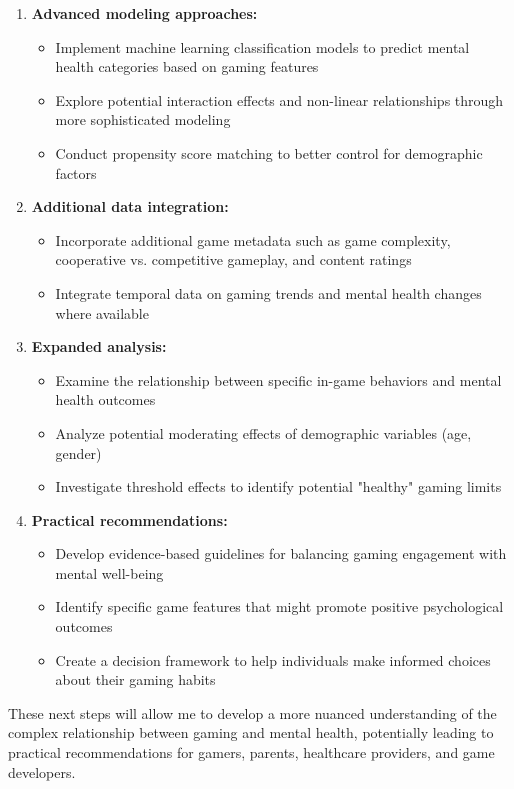 \documentclass[12pt]{article}
\begin{document}
\begin{enumerate}
    \item \textbf{Advanced modeling approaches:}
    \begin{itemize}
        \item Implement machine learning classification models to predict mental health categories based on gaming features
        \item Explore potential interaction effects and non-linear relationships through more sophisticated modeling
        \item Conduct propensity score matching to better control for demographic factors
    \end{itemize}

    \item \textbf{Additional data integration:}
    \begin{itemize}
        \item Incorporate additional game metadata such as game complexity, cooperative vs. competitive gameplay, and content ratings
        \item Integrate temporal data on gaming trends and mental health changes where available
    \end{itemize}

    \item \textbf{Expanded analysis:}
    \begin{itemize}
        \item Examine the relationship between specific in-game behaviors and mental health outcomes
        \item Analyze potential moderating effects of demographic variables (age, gender)
        \item Investigate threshold effects to identify potential "healthy" gaming limits
    \end{itemize}

    \item \textbf{Practical recommendations:}
    \begin{itemize}
        \item Develop evidence-based guidelines for balancing gaming engagement with mental well-being
        \item Identify specific game features that might promote positive psychological outcomes
        \item Create a decision framework to help individuals make informed choices about their gaming habits
    \end{itemize}
\end{enumerate}

\noindent
These next steps will allow me to develop a more nuanced understanding of the complex relationship between gaming and mental health, potentially leading to practical recommendations for gamers, parents, healthcare providers, and game developers.
\end{document}
